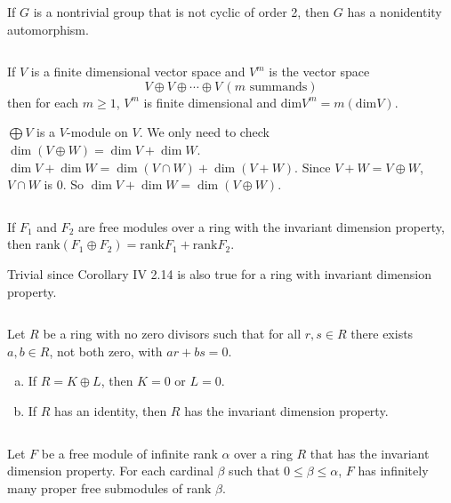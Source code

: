 $$ $$

\begin{ex}
    If $G$ is a nontrivial group that is not cyclic of order 2, then $G$ has a nonidentity automorphism.
\end{ex}

$$ $$

\begin{ex}
    If $V$ is a finite dimensional vector space and $V^{m}$ is the vector space\[V\oplus V\oplus\cdots\oplus V \,(m \text{ summands})\] then for each $m\geq 1$, $V^{m}$ is finite dimensional and $\mathrm{dim} V^{m}=m(\mathrm{dim}V)$.
\end{ex}

\begin{answer}
    $\bigoplus V$ is a $V$-module on $V$. We only need to check $\dim(V\oplus W)=\dim V+\dim W$. $\dim V+\dim W=\dim(V\cap W)+\dim (V+W)$. Since $V+W=V\oplus W$, $V\cap W$ is $0$. So $\dim V+\dim W=\dim(V\oplus W)$.
\end{answer}

$$ $$

\begin{ex}
    If $F_{1}$ and $F_{2}$ are free modules over a ring with the invariant dimension property, then $\mathrm{rank}(F_{1}\oplus F_{2})=\mathrm{rank}F_{1}+\mathrm{rank}F_{2}$.
\end{ex}

\begin{answer}
    Trivial since Corollary IV 2.14 is also true for a ring with invariant dimension property. 
\end{answer}

$$ $$

\begin{ex}
    Let $R$ be a ring with no zero divisors such that for all $r,s\in R$ there exists $a,b\in R$, not both zero, with $ar+bs=0$.
    \begin{enumerate}[(a)]
        \item If $R=K\oplus L$, then $K=0$ or $L=0$.
        \item If $R$ has an identity, then $R$ has the invariant dimension property.
    \end{enumerate}
\end{ex}

$$ $$

\begin{ex}
    Let $F$ be a free module of infinite rank $\alpha$ over a ring $R$ that has the invariant dimension property. For each cardinal $\beta$ such that $0\leq \beta\leq \alpha$, $F$ has infinitely many proper free submodules of rank $\beta$.
\end{ex}

